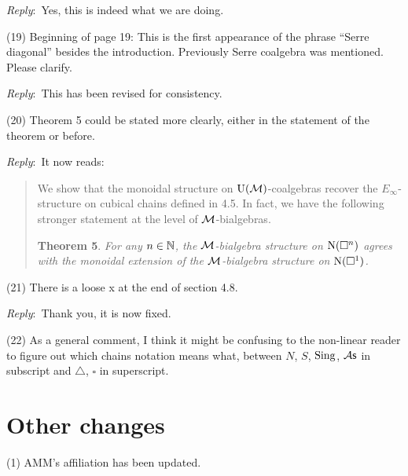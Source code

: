 \documentclass{amsart}
\newcommand{\ar}{\medskip\noindent\textit{Reply}:\ }
\newcommand{\rp}{\medskip\noindent}
\begin{document}
	\ar Yes, this is indeed what we are doing.

	\rp (19) Beginning of page 19: This is the first appearance of the phrase “Serre diagonal” besides the introduction.
	Previously Serre coalgebra was mentioned.
	Please clarify.

	\ar This has been revised for consistency. 

	(20) Theorem 5 could be stated more clearly, either in the statement of the
	theorem or before.

	\ar It now reads:

	\begin{quote}
		We show that the monoidal structure on ${\operatorname{U}(\mathcal{M})}$-coalgebras recover the $E_\infty$-structure on cubical chains defined in 4.5.
		In fact, we have the following stronger statement at the level of $\mathcal{M}$-bialgebras.

		\medskip\noindent\textbf{Theorem 5}.
		\textit{For any $n \in \mathbb{N}$, the $\mathcal{M}$-bialgebra structure on $\operatorname{N}(\square^n)$ agrees with the monoidal extension of the $\mathcal{M}$-bialgebra structure on $\operatorname{N}(\square^1)$.}
	\end{quote}

	\rp (21) There is a loose x at the end of section 4.8.

	\ar Thank you, it is now fixed.

	\rp (22) As a general comment, I think it might be confusing to the non-linear reader to figure out which chains notation means what, between $N$, $S$, $\operatorname{Sing}$, ${\mathcal{A}\mathsf{s}}$ in subscript and $\triangle$, $\square$ in superscript.


	\section{Other changes}

	\noindent (1) AMM's affiliation has been updated.

	\sloppy
	\printbibliography
\end{document}
